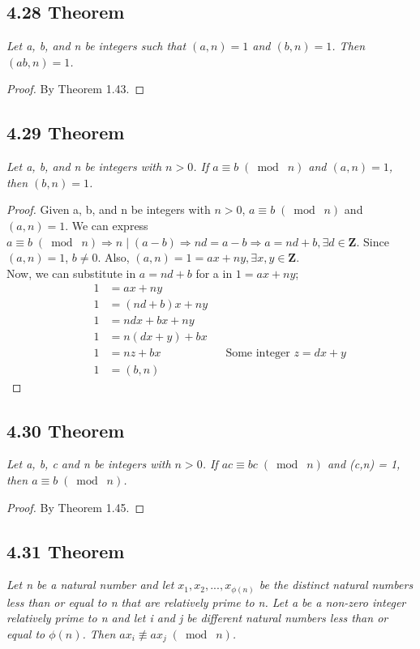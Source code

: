\documentclass{article}
\begin{document}
\subsection*{4.28 Theorem} 
\quad \textit{Let a, b, and n be integers such that $(a,n) = 1$ and $(b,n) = 1$. Then $(ab, n) = 1$.}

\begin{proof}
By Theorem 1.43.
\end{proof}

\subsection*{4.29 Theorem} 
\quad \textit{Let a, b, and n be integers with $n > 0$. If $a \equiv b \;(\bmod\; n)$ and $(a,n)=1$, then $(b,n)=1$.}

\begin{proof}
Given a, b, and n be integers with $n > 0$, $a \equiv b \;(\bmod\; n)$ and $(a,n)=1$. We can express $a \equiv b \;(\bmod\; n) \Longrightarrow n \mid (a - b) \Longrightarrow nd = a -b \Longrightarrow a = nd + b, \exists d \in \mathbf{Z}$. Since $(a, n) = 1$, $b \neq 0$. Also, $(a, n) = 1 = ax + ny, \exists x, y \in \mathbf{Z}$.\\

Now, we can substitute in $a = nd + b$ for a in $1 = ax + ny$;
\begin{align*}
    && 1 &= ax + ny &&\\
    && 1 &= (nd + b)x + ny &&\\
    && 1 &= ndx + bx + ny &&\\
    && 1 &= n(dx + y) + bx&&\\
    && 1 &= nz + bx&& \text{Some integer $z = dx+y$}\\
    && 1 &= (b, n)&&
\end{align*}
\end{proof}

\subsection*{4.30 Theorem} 
\quad \textit{Let a, b, c and n be integers with $n > 0$. If $ac \equiv bc \;(\bmod\; n)$ and (c,n) = 1, then $a \equiv b \;(\bmod\; n)$.}

\begin{proof}
By Theorem 1.45.
\end{proof}

\subsection*{4.31 Theorem} 
\quad \textit{Let n be a natural number and let $x_1, x_2, ...,x_{\phi(n)}$ be the distinct natural numbers less than or equal to n that are relatively prime to n. Let a be a non-zero integer relatively prime to n and let i and j be different natural numbers less than or equal to $\phi(n)$. Then $ax_i \not\equiv ax_j \;(\bmod\; n)$.}
\end{document}
